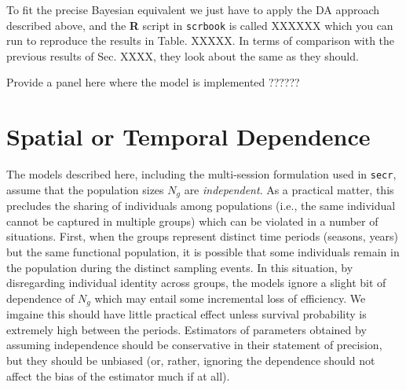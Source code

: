 To fit the precise Bayesian equivalent we just have to apply the DA
approach described above, and the {\bf R} script in \mbox{\tt scrbook}
is called XXXXXX which you can run to reproduce the results in Table. XXXXX.
In terms of comparison with the previous results of Sec. XXXX, they
look about the same as they should. 

Provide a panel here where the model is implemented ??????

\section{Spatial or Temporal Dependence}

The models described here, including the multi-session formulation
used in \mbox{\tt secr}, assume that the population sizes $N_{g}$ are
{\it independent}. As a practical matter, this precludes the sharing
of individuals among populations (i.e., the same individual cannot be
captured in multiple groups) which can be violated in a number of situations.
First, when the groups represent distinct time periods (seasons,
years) but the same functional population, it is possible that some
individuals remain in the population during the distinct sampling events.
In this situation, by disregarding individual identity across groups, the models ignore
a slight bit of 
dependence of $N_{g}$ which may entail some incremental 
 loss of efficiency. We imgaine this should
 have little practical  effect unless survival probability is
 extremely high between the periods.  Estimators of parameters obtained
 by assuming independence should be conservative in their statement of
 precision, but they should be unbiased (or, rather, 
 ignoring the dependence should not affect the bias of the estimator
 much if at all).

